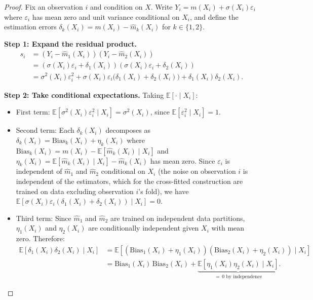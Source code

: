 \documentclass[11pt]{article}
\theoremstyle{plain}
\theoremstyle{definition}
\theoremstyle{remark}
\begin{document}
\begin{proof}
Fix an observation $i$ and condition on $X$. Write $Y_i = m(X_i) + \sigma(X_i)\varepsilon_i$ where $\varepsilon_i$ has mean zero and unit variance conditional on $X_i$, and define the estimation errors $\delta_k(X_i) = m(X_i) - \hat m_k(X_i)$ for $k \in \{1,2\}$.

\medskip
\noindent\textbf{Step 1: Expand the residual product.}
\begin{align*}
	s_i 
	&= (Y_i - \hat m_1(X_i))(Y_i - \hat m_2(X_i)) \\
	&= (\sigma(X_i)\varepsilon_i + \delta_1(X_i))(\sigma(X_i)\varepsilon_i + \delta_2(X_i)) \\
	&= \sigma^2(X_i)\varepsilon_i^2 
	+ \sigma(X_i)\varepsilon_i\bigl(\delta_1(X_i) + \delta_2(X_i)\bigr) 
	+ \delta_1(X_i)\delta_2(X_i).
\end{align*}

\medskip
\noindent\textbf{Step 2: Take conditional expectations.}
Taking $\mathbb E[\cdot \mid X_i]$:
\begin{itemize}
	\item First term: $\mathbb E[\sigma^2(X_i)\varepsilon_i^2 \mid X_i] = \sigma^2(X_i)$, since $\mathbb E[\varepsilon_i^2 \mid X_i] = 1$.
	\item Second term: Each $\delta_k(X_i)$ decomposes as $\delta_k(X_i) = \mathrm{Bias}_k(X_i) + \eta_k(X_i)$ where $\mathrm{Bias}_k(X_i) = m(X_i) - \mathbb E[\hat m_k(X_i) \mid X_i]$ and $\eta_k(X_i) = \mathbb E[\hat m_k(X_i) \mid X_i] - \hat m_k(X_i)$ has mean zero. Since $\varepsilon_i$ is independent of $\hat m_1$ and $\hat m_2$ conditional on $X_i$ (the noise on observation $i$ is independent of the estimators, which for the cross-fitted construction are trained on data excluding observation $i$'s fold), we have $\mathbb E[\sigma(X_i)\varepsilon_i(\delta_1(X_i) + \delta_2(X_i)) \mid X_i] = 0$.
	\item Third term: Since $\hat m_1$ and $\hat m_2$ are trained on independent data partitions, $\eta_1(X_i)$ and $\eta_2(X_i)$ are conditionally independent given $X_i$ with mean zero. Therefore:
	\begin{align*}
		\mathbb E[\delta_1(X_i)\delta_2(X_i) \mid X_i] 
		&= \mathbb E[(\mathrm{Bias}_1(X_i) + \eta_1(X_i))(\mathrm{Bias}_2(X_i) + \eta_2(X_i)) \mid X_i] \\
		&= \mathrm{Bias}_1(X_i)\,\mathrm{Bias}_2(X_i) + \underbrace{\mathbb E[\eta_1(X_i)\eta_2(X_i) \mid X_i]}_{=\,0\text{ by independence}}.
	\end{align*}
\end{itemize}


\end{proof}
\end{document}
